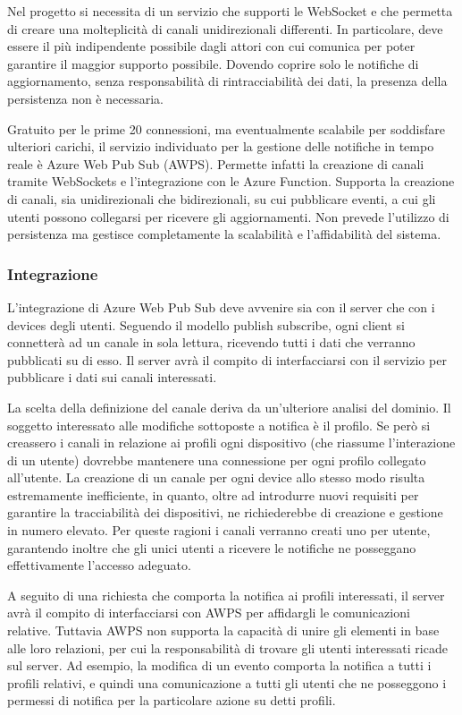 Nel progetto si necessita di un servizio che supporti le WebSocket e che permetta di creare una molteplicità di canali unidirezionali differenti. In particolare, deve essere il più indipendente possibile dagli attori con cui comunica per poter garantire il maggior supporto possibile. Dovendo coprire solo le notifiche di aggiornamento, senza responsabilità di rintracciabilità dei dati, la presenza della persistenza non è necessaria.

Gratuito per le prime 20 connessioni, ma eventualmente scalabile per soddisfare ulteriori carichi, il servizio individuato per la gestione delle notifiche in tempo reale è Azure Web Pub Sub (AWPS). Permette infatti la creazione di canali tramite WebSockets e l’integrazione con le Azure Function. Supporta la creazione di canali, sia unidirezionali che bidirezionali, su cui pubblicare eventi, a cui gli utenti possono collegarsi per ricevere gli aggiornamenti. Non prevede l’utilizzo di persistenza ma gestisce completamente la scalabilità e l’affidabilità del sistema.



\subsubsection{Integrazione}

L’integrazione di Azure Web Pub Sub deve avvenire sia con il server che con i devices degli utenti. Seguendo il modello publish subscribe, ogni client si connetterà ad un canale in sola lettura, ricevendo tutti i dati che verranno pubblicati su di esso. Il server avrà il compito di interfacciarsi con il servizio per pubblicare i dati sui canali interessati.

La scelta della definizione del canale deriva da un’ulteriore analisi del dominio. 
Il soggetto interessato alle modifiche sottoposte a notifica è il profilo. 
Se però si creassero i canali in relazione ai profili ogni dispositivo (che riassume l’interazione di un utente) dovrebbe mantenere una connessione per ogni profilo collegato all’utente. La creazione di un canale per ogni device allo stesso modo risulta estremamente inefficiente, in quanto, oltre ad introdurre nuovi requisiti per garantire la tracciabilità dei dispositivi, ne richiederebbe di creazione e gestione in numero elevato. Per queste ragioni i canali verranno creati uno per utente, garantendo inoltre che gli unici utenti a ricevere le notifiche ne posseggano effettivamente l’accesso adeguato.

A seguito di una richiesta che comporta la notifica ai profili interessati, il server avrà il compito di interfacciarsi con AWPS per affidargli le comunicazioni relative. Tuttavia AWPS non supporta la capacità di unire gli elementi in base alle loro relazioni, per cui la responsabilità di trovare gli utenti interessati ricade sul server. 
Ad esempio, la modifica di un evento comporta la notifica a tutti i profili relativi, e quindi una comunicazione a tutti gli utenti che ne posseggono i permessi di notifica per la particolare azione su detti profili. 

